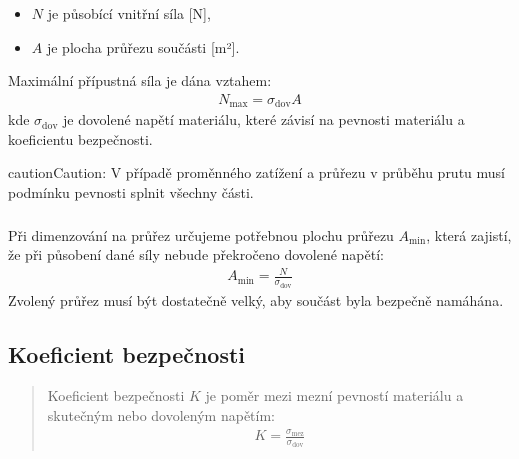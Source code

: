 \documentclass[letterpaper,10pt,english]{jupyterBook}
\begin{document}
{{\begin{itemize}
\item {} 
\sphinxAtStartPar
\(N\) je působící vnitřní síla {[}N{]},

\item {} 
\sphinxAtStartPar
\(A\) je plocha průřezu součásti {[}m²{]}.

\end{itemize}

\sphinxAtStartPar
Maximální přípustná síla je dána vztahem:
\begin{equation*}
\begin{split}
N_{\text{max}} = \sigma_\text{dov} A
\end{split}
\end{equation*}
\sphinxAtStartPar
kde \(\sigma_{\text{dov}}\) je dovolené napětí materiálu, které závisí na pevnosti materiálu a koeficientu bezpečnosti.

\begin{sphinxadmonition}{caution}{Caution:}
\sphinxAtStartPar
V případě proměnného zatížení a průřezu v průběhu prutu musí podmínku pevnosti splnit všechny části.
\end{sphinxadmonition}


\subsubsection{}
\label{\detokenize{Prednasky/2_8_Dimenzovani:dimenzovani-na-prurez}}
\sphinxAtStartPar
Při dimenzování na průřez určujeme potřebnou plochu průřezu \(A_{\text{min}}\), která zajistí, že při působení dané síly nebude překročeno dovolené napětí:
\begin{equation*}
\begin{split}
A_{\text{min}} = \frac{N}{\sigma_{\text{dov}}}
\end{split}
\end{equation*}
\sphinxAtStartPar
Zvolený průřez musí být dostatečně velký, aby součást byla bezpečně namáhána.


\subsection{Koeficient bezpečnosti}
\label{\detokenize{Prednasky/2_8_Dimenzovani:koeficient-bezpecnosti}}\begin{quote}

\sphinxAtStartPar
Koeficient bezpečnosti \(K\) je poměr mezi mezní pevností materiálu a skutečným nebo dovoleným napětím:
\begin{equation*}
\begin{split}K = \frac{\sigma_{\text{mez}}}{\sigma_{\text{dov}}}\end{split}
\end{equation*}\end{quote}

}}
\end{document}
